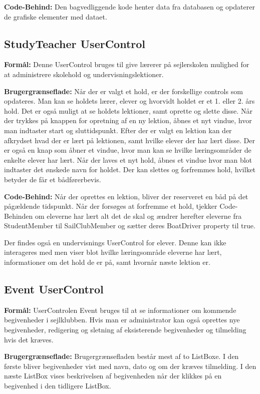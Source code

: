 \textbf{Code-Behind:}
Den bagvedliggende kode henter data fra databasen og opdaterer de grafiske elementer med dataet. 


\subsection{StudyTeacher UserControl}

\textbf{Formål:}
Denne UserControl bruges til give lærerer på sejlerskolen mulighed for at administrere skolehold og undervisningslektioner.

\textbf{Brugergrænseflade:}
Når der er valgt et hold, er der forskellige controls som opdateres.
Man kan se holdets lærer, elever og hvorvidt holdet er et 1. eller 2. års hold. 
Det er også muligt at se holdets lektioner, samt oprette og slette disse.
Når der trykkes på knappen for opretning af en ny lektion, åbnes et nyt vindue, hvor man indtaster start og sluttidspunkt.
Efter der er valgt en lektion kan der afkrydset hvad der er lært på lektionen, samt hvilke elever der har lært disse.
Der er også en knap som åbner et vindue, hvor man kan se hvilke læringsområder de enkelte elever har lært.
Når der laves et nyt hold, åbnes et vindue hvor man blot indtaster det ønskede navn for holdet.
Der kan slettes og forfremmes hold, hvilket betyder de får et bådførerbevis.

\textbf{Code-Behind:}
Når der oprettes en lektion, bliver der reserveret en båd på det pågældende tidspunkt.
Når der forsøges at forfremme et hold, tjekker Code-Behinden om eleverne har lært alt det de skal og ændrer herefter eleverne fra StudentMember til SailClubMember og sætter deres BoatDriver property til true.

Der findes også en undervisnings UserControl for elever. 
Denne kan ikke interageres med men viser blot hvilke læringsområde eleverne har lært, informationer om det hold de er på, samt hvornår næste lektion er.

\subsection{Event UserControl}
\textbf{Formål:}
UserControlen Event bruges til at se informationer om kommende begivenheder i sejlklubben. 
Hvis man er administrator kan også oprettes nye begivenheder, redigering og sletning af eksisterende begivenheder og tilmelding hvis det kræves.

\textbf{Brugergrænseflade:}
Brugergrænsefladen består mest af to ListBoxe.
I den første bliver begivenheder vist med navn, dato og om der kræves tilmelding.
I den næste ListBox vises beskrivelsen af begivenheden når der klikkes på en begivenhed i den tidligere ListBox. 

